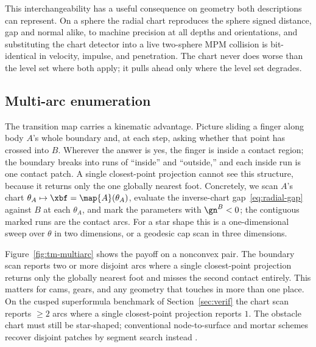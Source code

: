 This interchangeability has a useful consequence on geometry both descriptions can represent. On a sphere
the radial chart reproduces the sphere signed distance, gap and normal alike, to machine precision at
all depths and orientations, and substituting the chart detector into a live two-sphere MPM collision is
bit-identical in velocity, impulse, and penetration. The chart never does worse than the level set where
both apply; it pulls ahead only where the level set degrades.

\subsection{Multi-arc enumeration}\label{sec:tmap:multiarc}

The transition map carries a kinematic advantage. Picture sliding a finger
along body $A$'s whole boundary and, at each step, asking whether that point has crossed into $B$. Wherever
the answer is yes, the finger is inside a contact region; the boundary breaks into runs of ``inside'' and
``outside,'' and each inside run is one contact patch. A single closest-point projection cannot see this
structure, because it returns only the one globally nearest foot. Concretely, we scan $A$'s chart
$\theta_A\mapsto\xbf=\map{A}(\theta_A)$, evaluate the inverse-chart gap~\eqref{eq:radial-gap} against $B$
at each $\theta_A$, and mark the parameters with $\gn^B<0$; the contiguous marked runs are the contact
arcs. For a star shape this is a one-dimensional sweep over $\theta$ in two dimensions, or a geodesic cap
scan in three dimensions.

Figure~\ref{fig:tm-multiarc} shows the payoff on a nonconvex pair. The boundary scan reports two or more
disjoint arcs where a single closest-point projection returns only the globally nearest foot and misses
the second contact entirely. This matters for cams, gears, and any geometry that touches in more than one
place. On the cusped superformula benchmark of Section~\ref{sec:verif} the chart scan reports $\ge 2$ arcs
where a single closest-point projection reports $1$. The obstacle chart must still be star-shaped;
conventional node-to-surface and mortar schemes recover disjoint patches by segment search instead
\citep{zavarise1998segment,puso2004mortar,fischer2005frictionless}.

